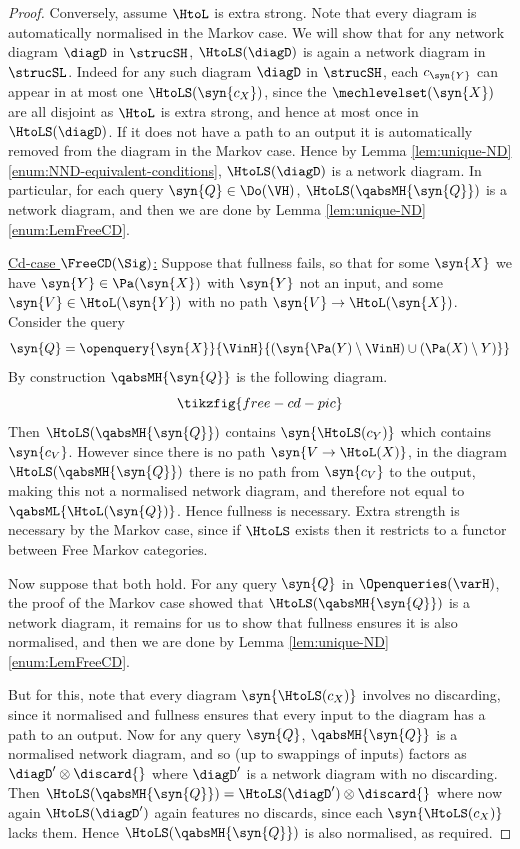 \documentclass{article}
\begin{document}
{\begin{proof}
Conversely, assume $\HtoL$ is extra strong. Note that every diagram is automatically normalised in the Markov case. We will show that for any network diagram $\diagD$ in $\strucSH$, $\HtoLS(\diagD)$ is again a network diagram in $\strucSL$. Indeed for any such diagram $\diagD$ in $\strucSH$, each $c_\syn{Y}$ can appear in at most one $\HtoLS(\syn{c_X})$, since the $\mechlevelset(\syn{X})$ are all disjoint as $\HtoL$ is extra strong, and hence at most once in $\HtoLS(\diagD)$. If it does not have a path to an output it is automatically removed from the diagram in the Markov case. Hence by Lemma \ref{lem:unique-ND} \eqref{enum:NND-equivalent-conditions}, $\HtoLS(\diagD)$ is a network diagram. In particular, for each query $\syn{Q} \in \Do(\VH)$, $\HtoLS(\qabsMH{\syn{Q}})$ is a network diagram, and then we are done by Lemma \ref{lem:unique-ND} \eqref{enum:LemFreeCD}. 


\underline{Cd-case $\FreeCD(\Sig)$:} Suppose that fullness fails, so that for some $\syn{X}$ we have $\syn{Y} \in \Pa(\syn{X})$ with $\syn{Y}$ not an input, and some $\syn{V} \in \HtoL(\syn{Y})$ with no path $\syn{V} \to \HtoL(\syn{X})$. 
Consider the query 
\[
\syn{Q} = \openquery{\syn{X}}{\VinH}{(\syn{\Pa(Y) \setminus \VinH) \cup (\Pa(X) \setminus Y)}}
\] 
By construction $\qabsMH{\syn{Q}}$ is the following diagram. 
\[
\tikzfig{free-cd-pic}
\]
Then $\HtoLS(\qabsMH{\syn{Q}})$ contains $\syn{\HtoLS(c_Y)}$ which contains $\syn{c_V}$. However since there is no path $\syn{ V \to \HtoL(X)}$, in the diagram $\HtoLS(\qabsMH{\syn{Q}})$ there is no path from $\syn{c_V}$ to the output, making this not a normalised network diagram, and therefore not equal to $\qabsML{\HtoL(\syn{Q})}$. Hence fullness is necessary. Extra strength is necessary by the Markov case, since if $\HtoLS$ exists then it restricts to a functor between Free Markov categories.

Now suppose that both hold. For any query $\syn{Q}$ in $\Openqueries(\varH)$, the proof of the Markov case showed that $\HtoLS(\qabsMH{\syn{Q}})$ is a network diagram, it remains for us to show that fullness ensures it is also normalised, and then we are done by Lemma \ref{lem:unique-ND} \eqref{enum:LemFreeCD}. 

But for this, note that every diagram $\syn{\HtoLS(c_X)}$ involves no discarding, since it normalised and fullness ensures that every input to the diagram has a path to an output. Now for any query $\syn{Q}$, $\qabsMH{\syn{Q}}$ is a normalised network diagram, and so (up to swappings of inputs) factors as $\diagD' \otimes \discard{}$ where $\diagD'$ is a network diagram with no discarding. 
Then $\HtoLS(\qabsMH{\syn{Q}}) = \HtoLS(\diagD') \otimes \discard{}$ where now again $\HtoLS(\diagD')$ again features no discards, since each $\syn{\HtoLS(c_X)}$ lacks them. Hence $\HtoLS(\qabsMH{\syn{Q}})$ is also normalised, as required. 
\end{proof}



}
\end{document}
